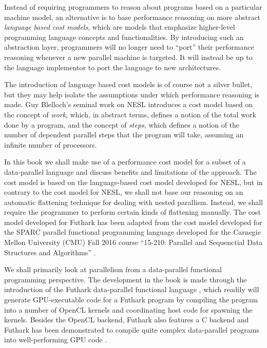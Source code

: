 \documentclass[11pt]{book}
\begin{document}
Instead of requiring programmers to reason about programs based on a
particular machine model, an alternative is to base performance
reasoning on more abstract \emph{language based cost models}, which
are models that emphasize higher-level programming language concepts and
functionalities. By introducing such an abstraction layer, programmers will
no longer need to ``port'' their performance reasoning whenever a new
parallel machine is targeted. It will instead be up to the language
implementor to port the language to new architectures.

The introduction of language based cost models is of course not a
silver bullet, but they may help isolate the assumptions under which
performance reasoning is made. Guy Blelloch's seminal work on NESL
\cite{blelloch1990vector,blelloch1994implementation} introduces a cost
model based on the concept of \emph{work}, which, in abstract terms,
defines a notion of the total work done by a program, and the concept
of \emph{steps}, which defines a notion of the number of dependent
parallel steps that the program will take, assuming an infinite number
of processors.

In this book we shall make use of a performance cost model for a
subset of a data-parallel language and discuss benefits and
limitations of the approach. The cost model is based on the
language-based cost model developed for NESL, but in contrary to the
cost model for NESL, we shall not base our reasoning on an automatic
flattening technique for dealing with nested parallism. Instead, we
shall require the programmer to perform certain kinds of flattening
manually. The cost model developed for Futhark has been adapted from
the cost model developed for the SPARC parallel functional programming
language developed for the Carnegie Mellon University (CMU) Fall 2016
course ``15-210: Parallel and Sequenctial Data Structures and
Algorithms'' \cite{algdesign:parseq2016}.

We shall primarily look at parallelism from a data-parallel functional
programming perspective. The development in the book is made through
the introduction of the Futhark data-parallel functional language
\cite{henriksen2014size,henriksen2016design,henriksen2014bounds,henriksen2013t2},
which readily will generate GPU-executable code for a Futhark program
by compiling the program into a number of OpenCL kernels and
coordinating host code for spawning the kernels. Besides the OpenCL
backend, Futhark also features a C backend and Futhark has been
demonstrated to compile quite complex data-parallel programs into
well-performing GPU code \cite{finpar,apltofuthark2016}.
\end{document}
